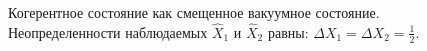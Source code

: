 \begin{figure}
\centering



\caption{Когерентное состояние как смещенное вакуумное
  состояние. Неопределенности наблюдаемых $\hat{X}_1$ и $\hat{X}_2$
  равны: $\Delta X_1 = \Delta X_2 = \frac{1}{2}$.} 
\label{figPart3Squeezed_6}
\end{figure}
